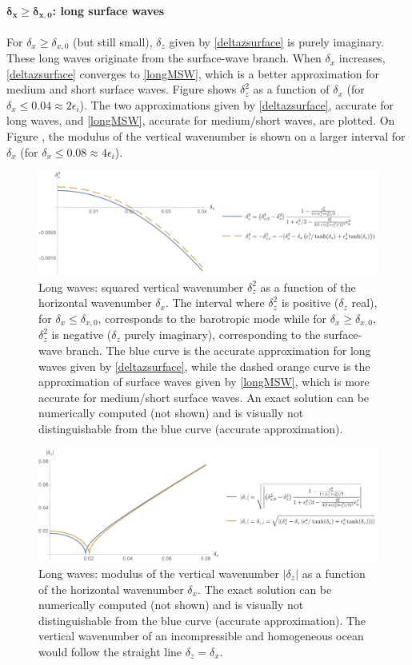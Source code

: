 \paragraph{$\boldsymbol{\delta_x \ge \delta_{x,0}}$: long surface waves}
For $\delta_x \ge \delta_{x,0}$ (but still small), $\delta_z$ given by \ref{deltazsurface} is purely imaginary. These long waves originate from the surface-wave branch.
When $\delta_x$ increases, \ref{deltazsurface} converges to \ref{longMSW}, which is a better approximation for medium and short surface waves.
Figure  shows $\delta_z^2$ as a function of $\delta_x$ (for $\delta_x \le 0.04\approx 2\epsilon_i$). The two approximations given by \ref{deltazsurface}, accurate for long waves, and \ref{longMSW}, accurate for medium/short waves, are plotted. On Figure , the modulus of the vertical wavenumber is shown on a larger interval for $\delta_x$ (for $\delta_x \le 0.08\approx 4\epsilon_i$).
\begin{figure}[h]
	\centerline{
		\includegraphics[width=0.9\linewidth]{FIGURES/dz2dx.png}
	}
\caption{Long waves: squared vertical wavenumber $\delta_z^2$ as a function of the horizontal wavenumber $\delta_x$. The interval where $\delta_z^2$ is positive ($\delta_z$ real), for $\delta_x\le \delta_{x,0}$, corresponds to the barotropic mode while for $\delta_x\ge \delta_{x,0}$, $\delta_z^2$ is negative ($\delta_z$ purely imaginary), corresponding to the surface-wave branch. The blue curve is the accurate approximation for long waves given by \ref{deltazsurface}, while the dashed orange curve is the approximation of surface waves given by \ref{longMSW}, which is more accurate for medium/short surface waves. An exact solution can be numerically computed (not shown) and is visually not distinguishable from the blue curve (accurate approximation).}
\label{dz2dx}
\end{figure}
\begin{figure}[h]
	\centerline{
		\includegraphics[width=0.9\linewidth]{FIGURES/dzdx.png}
	}
	\caption{Long waves: modulus of the vertical wavenumber $|\delta_z|$ as a function of the horizontal wavenumber $\delta_x$. The exact solution can be numerically computed (not shown) and is visually not distinguishable from the blue curve (accurate approximation). The vertical wavenumber of an incompressible and homogeneous ocean would follow the straight line $\delta_z=\delta_x$.}
	\label{dzdx}
\end{figure}
